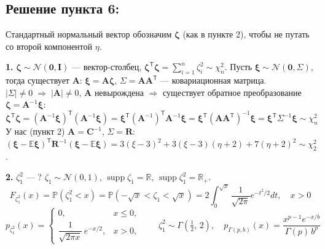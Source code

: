 \documentclass[12pt]{spbstu-task}
\begin{document}
\subsection*{Решение пункта 6:}
Стандартный нормальный вектор обозначим \(\boldsymbol{\zeta}\) (как в пункте 2), чтобы не путать со второй компонентой \(\eta\).

\textbf{1.} \(\boldsymbol{\zeta}\sim\mathcal{N}(\mathbf{0},\mathbf{I})\) --- вектор-столбец, \(\boldsymbol{\zeta}^\mathsf{T}\boldsymbol{\zeta} = \sum_{i=1}^n\zeta_i^2\sim\chi^2_n\).
Пусть \(\boldsymbol{\xi}\sim\mathcal{N}(\mathbf{0},\Sigma)\), тогда существует \(\mathbf{A}\): \(\boldsymbol{\xi} = \mathbf{A}\boldsymbol{\zeta}\), \(\Sigma = \mathbf{A}\mathbf{A}^\mathsf{T}\) --- ковариационная матрица.
\(|\Sigma|\neq 0\;\Rightarrow\;|\mathbf{A}|\neq 0\), \(\mathbf{A}\) невырождена \(\Rightarrow\) существует обратное преобразование \(\boldsymbol{\zeta} = \mathbf{A}^{-1}\boldsymbol{\xi}\):
\begin{displaymath}
  \boldsymbol{\zeta}^\mathsf{T}\boldsymbol{\zeta} = \left(\mathbf{A}^{-1}\boldsymbol{\xi}\right)^\mathsf{T}\left(\mathbf{A}^{-1}\boldsymbol{\xi}\right)
  = \boldsymbol{\xi}^\mathsf{T}\left(\mathbf{A}^{-1}\right)^\mathsf{T}\mathbf{A}^{-1}\boldsymbol{\xi}
  = \boldsymbol{\xi}^\mathsf{T}\left(\mathbf{A}\mathbf{A}^\mathsf{T}\right)^{-1}\boldsymbol{\xi}
  = \boldsymbol{\xi}^\mathsf{T}\Sigma^{-1}\boldsymbol{\xi}\sim\chi^2_n
\end{displaymath}
У нас (пункт 2) \(\mathbf{A} = \mathbf{C}^{-1}\), \(\Sigma = \mathbf{R}\):
\(\left(\boldsymbol{\xi} - \mathbb{E}\boldsymbol{\xi}\right)^\mathsf{T}\mathbf{R}^{-1}\left(\boldsymbol{\xi} - \mathbb{E}\boldsymbol{\xi}\right) = 3(\xi - 3)^2 + 3(\xi - 3)(\eta + 2) + 7(\eta + 2)^2\sim\chi^2_2\).

\textbf{2.} \(\zeta_1^2\) --- ? \(\zeta_1\sim\mathcal{N}(0,1)\), \(\operatorname{supp}\zeta_1 = \mathbb{R}\), \(\operatorname{supp}\zeta_1^2 = \mathbb{R}_+\).
\begin{displaymath}
  F_{\zeta_1^2}(x) = \mathbb{P}\left(\zeta_1^2 < x\right) = \mathbb{P}\left(-\sqrt{x} < \zeta_1 < \sqrt{x}\right) = 2\int_0^{\sqrt{x}}\frac{1}{\sqrt{2\pi}}e^{-t^2/2}dt,\quad x > 0
\end{displaymath}
\begin{displaymath}
  p_{\zeta_1^2}(x) = \begin{cases}
    0, & x\leq 0, \\
    \dfrac{1}{\sqrt{2\pi x}}\,e^{-x/2}, & x > 0,
  \end{cases}
  \qquad \zeta_1^2\sim\Gamma\left(\tfrac{1}{2},\,2\right),\quad
  p_{\Gamma(p,b)}(x) = \frac{x^{p - 1}e^{-x/b}}{\Gamma(p)\,b^p}
\end{displaymath}
\end{document}
